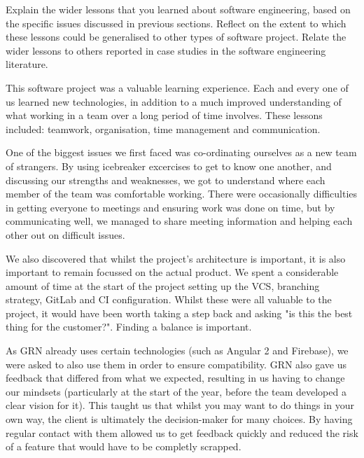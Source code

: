 \documentclass{l3proj}
\begin{document}
Explain the wider lessons that you learned about software engineering,
based on the specific issues discussed in previous sections.  Reflect
on the extent to which these lessons could be generalised to other
types of software project.  Relate the wider lessons to others
reported in case studies in the software engineering literature.


This software project was a valuable learning experience. Each and every one of
 us learned new technologies, in addition to a much improved understanding
 of what working in a team over a long period of time involves. These lessons
 included: teamwork, organisation, time management and communication.
 
One of the biggest issues we first faced was co-ordinating ourselves as a 
 new team of strangers. By using icebreaker excercises to get to know 
 one another, and discussing our strengths and weaknesses, we got to 
 understand where each member of the team was comfortable working. There
 were occasionally difficulties in getting everyone to meetings and ensuring
 work was done on time, but by communicating well, we managed to share
 meeting information and helping each other out on difficult issues.
 
We also discovered that whilst the project's architecture is important, 
 it is also important to remain focussed on the actual product. We 
 spent a considerable amount of time at the start of the project setting 
 up the VCS, branching strategy, GitLab and CI configuration. Whilst these
 were all valuable to the project, it would have been worth taking a step
 back and asking "is this the best thing for the customer?". Finding a balance
 is important.
 
As GRN already uses certain technologies (such as Angular 2 and Firebase),
 we were asked to also use them in order to ensure compatibility. GRN also
 gave us feedback that differed from what we expected, resulting in us 
 having to change our mindsets (particularly at the start of the year,
 before the team developed a clear vision for it). This taught us that 
 whilst you may want to do things in your own way, the client is ultimately
 the decision-maker for many choices. By having regular contact with them
 allowed us to get feedback quickly and reduced the risk of a feature that
 would have to be completly scrapped.
 
\end{document}

